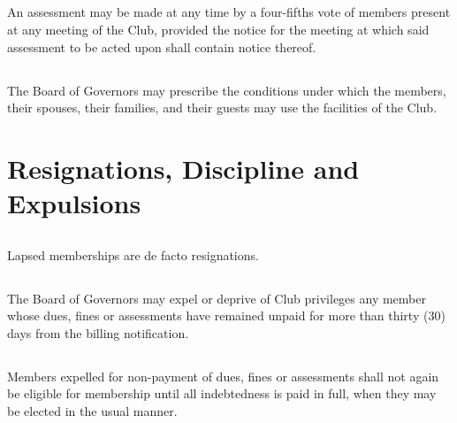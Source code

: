 \documentclass[11pt,american,letterpaper,]{constitution}
\begin{document}
\subsection[Assessment]{} 

An assessment may be made at any time by a four-fifths vote of members present at any meeting of the Club, provided the notice for the meeting at which said assessment to be acted upon shall contain notice thereof.

\subsection[Conditions]{} 

The Board of Governors may prescribe the conditions under which the members, their spouses, their families, and their guests may use the facilities of the Club.


\section{Resignations, Discipline and Expulsions}

\subsection[Lapsed Memberships]{} 

Lapsed memberships are de facto resignations.

\subsection[Expulsion]{} 

The Board of Governors may expel or deprive of Club privileges any member whose dues, fines or assessments have remained unpaid for more than thirty (30) days from the billing notification.

\subsection[Eligibility]{} 

Members expelled for non-payment of dues, fines or assessments shall not again be eligible for membership until all indebtedness is paid in full, when they may be elected in the usual manner.

\subsection[Boathouse Command]{} 
\end{document}
